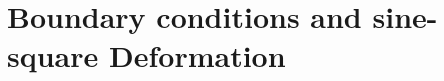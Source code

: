 \documentclass[11pt, a4paper, oneside]{book}
\theoremstyle{definition} %
\begin{document}
%
%
%
%

\section{Boundary conditions and sine-square Deformation}


%
%
\end{document}
